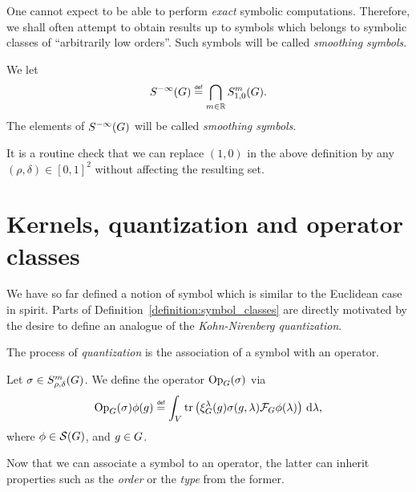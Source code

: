 One cannot expect to be able to perform \emph{exact} symbolic computations.
Therefore,
we shall often attempt to obtain results up to symbols which belongs to symbolic classes of ``arbitrarily low orders''.
Such symbols will be called \emph{smoothing symbols}.

\begin{definition}
\label{definition:smoothing_symbols}
    We let
    \begin{align*}
        \SmoothingSymbols \defeq \bigcap_{m \in \R} \SymbolClass{m}{1, 0}.
    \end{align*}
    The elements of ${S^{-\infty} (G)}$ will be called \emph{smoothing symbols}.
\end{definition}

It is a routine check that we can replace $(1, 0)$ in the above definition
by any $(\rho, \delta) \in [0, 1]^2$ without affecting the resulting set.

\section{Kernels, quantization and operator classes}

We have so far defined a notion of symbol which is similar to the Euclidean case in spirit.
Parts of Definition~\ref{definition:symbol_classes} are directly motivated by the desire to define an analogue of the \emph{Kohn-Nirenberg quantization}.

The process of \emph{quantization} is the association of a symbol with an operator.

\begin{definition}[Quantization]
\label{definition:quantization}
    Let $\sigma \in S^{m}_{\rho, \delta}(G)$.
    We define the operator $\mathrm{Op}_{G}(\sigma)$ via
    \begin{align*}
        \Op(\sigma) \phi(g) \defeq
        \int_\VectorSpace
            \tr\left(\Rep\lambda(g) \sigma(g, \lambda) \Fourier \phi(\lambda)\right)
        \dd \lambda,
    \end{align*}
    where $\phi \in {\mathcal{S} (G)}$, and $g \in G$.
\end{definition}

Now that we can associate a symbol to an operator,
the latter can inherit properties such as the \emph{order} or the \emph{type} from the former.

